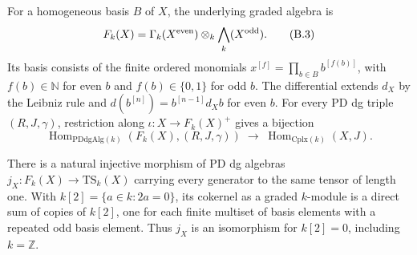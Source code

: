 \begin{proposition}
\label{B002}
For a homogeneous basis $B$ of $X$, the underlying graded algebra is
\[
F_k(X)=\Gamma_k(X^{\rm even})\otimes_k\bigwedge_k(X^{\rm odd}).
                                                               \tag{B.3}
\]
Its basis consists of the finite ordered monomials
$x^{[f]}=\prod_{b\in B}b^{[f(b)]}$, with $f(b)\in\mathbb N$ for even
$b$ and $f(b)\in\{0,1\}$ for odd $b$.  The differential extends $d_X$ by
the Leibniz rule and $d(b^{[n]})=b^{[n-1]}d_Xb$ for even $b$.
For every PD dg triple $(R,J,\gamma)$, restriction along
$\iota:X\to F_k(X)^+$ gives a bijection
\[
\operatorname{Hom}_{\mathrm{PDdgAlg}(k)}(F_k(X),(R,J,\gamma))
\;\longrightarrow\;
\operatorname{Hom}_{\mathrm{Cplx}(k)}(X,J).                       \tag{B.4}
\]

There is a natural injective morphism of PD dg algebras
$j_X:F_k(X)\to\mathrm{TS}_k(X)$ carrying every generator to the same
tensor of length one.  With $k[2]=\{a\in k:2a=0\}$, its cokernel as a
graded $k$-module is a direct sum of copies of $k[2]$, one for each
finite multiset of basis elements with a repeated odd basis element.
Thus $j_X$ is an isomorphism for $k[2]=0$, including $k=\mathbb Z$.
\end{proposition}

